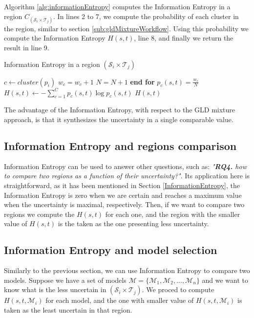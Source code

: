 Algorithm \ref{alg:informationEntropy}  computes the Information Entropy in a region $C_{(\mathcal{S}_{i} \times \mathcal{T}_{j})}$. In lines 2 to 7, we compute the probability of each cluster in the region, similar to section \ref{sub:gldMixtureWorkflow}. Using this probability we compute the Information Entropy $H(s, t)$, line 8, and finally we return the result in line 9.

\begin{algorithm} 
\caption{Information Entropy in a region $(\mathcal{S}_{i} \times \mathcal{T}_{j})$}\label{alg:informationEntropy}
\begin{algorithmic}[1] 
\State $c \gets cluster(p_i)$
\State $w_c= w_c+1$
\State $N=N+1$
\EndFor
\State \textbf{end for}
\State $p_{c}(s,t)= \frac{w_c}{N}$
\State $H(s, t) \gets -\sum_{c=1}^C p_{c}(s,t)\log p_{c}(s,t)$
\State \Return $H(s, t)$
\EndFunction 
\end{algorithmic} 
\end{algorithm} 

The advantage of the Information Entropy, with respect to the GLD mixture approach, is that it synthesizes the uncertainty in a single comparable value.  

\subsection{Information Entropy and regions comparison}
Information Entropy can be used to answer other questions, such as: \textit{"\textbf{RQ4.} how to compare two regions as a function of their uncertainty?"}.  Its application here is straightforward, as it has been mentioned in Section \ref{InformationEntropy}, the Information Entropy is zero when we are certain and reaches a maximum value when the uncertainty is maximal, respectively. Then, if we want to compare two regions we compute the $H(s, t)$ for each one, and the region with the smaller value of $H(s, t)$ is the taken as the one presenting less uncertainty.  

\subsection{Information Entropy and model selection}
Similarly to the previous section, we can use Information Entropy to compare two models. Suppose we have a set of models $\mathcal{M} = \lbrace \mathcal{M}_{1}, \mathcal{M}_{2},...,\mathcal{M}_{n} \rbrace$ and we want to know what is the less uncertain in $(\mathcal{S}_{i} \times \mathcal{T}_{j})$. We proced to compute $H(s,t, \mathcal{M}_{i})$ for each model, and the one with smaller value of $H(s,t, \mathcal{M}_{i})$ is taken as the least uncertain in that region.

